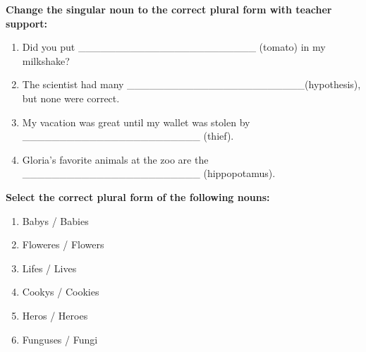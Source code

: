 \documentclass[12pt]{article}
\begin{document}
\vspace{1em}
\begin{tcolorbox}[colframe=black!60, colback=white, 
coltitle=black, colbacktitle=black!15, fonttitle=\bfseries\Large, 
title=Guided Practice, halign title=center, left=10pt, right=10pt, top=10pt, bottom=15pt]
\textbf{Change the singular noun to the correct plural form with teacher support:}
\begin{enumerate}[itemsep=3em] %
    \item Did you put  \_\_\_\_\_\_\_\_\_\_\_\_\_\_\_\_\_\_\_\_\_\_\_\_ (tomato) in my milkshake?
    \item     The scientist had many \_\_\_\_\_\_\_\_\_\_\_\_\_\_\_\_\_\_\_\_\_\_\_\_(hypothesis), but none were correct.
    \item My vacation was great until my wallet was stolen by \_\_\_\_\_\_\_\_\_\_\_\_\_\_\_\_\_\_\_\_\_\_\_\_ (thief).
    \item Gloria's favorite animals at the zoo are the \_\_\_\_\_\_\_\_\_\_\_\_\_\_\_\_\_\_\_\_\_\_\_\_ (hippopotamus).
\vspace{1.5em}\end{enumerate}
\end{tcolorbox}
\begin{tcolorbox}[colframe=black!60, colback=white, 
coltitle=black, colbacktitle=black!15, fonttitle=\bfseries\Large, 
title=Independent Practice, halign title=center, left=10pt, right=10pt, top=10pt, bottom=15pt]
\textbf{Select the correct plural form of the following nouns:}
\begin{enumerate}[itemsep=1em] %
    \item Babys / Babies
    \item Floweres / Flowers
    \item Lifes / Lives
    \item Cookys / Cookies
    \item Heros / Heroes
    \item Funguses / Fungi
\end{enumerate}
\end{tcolorbox}
\end{document}
